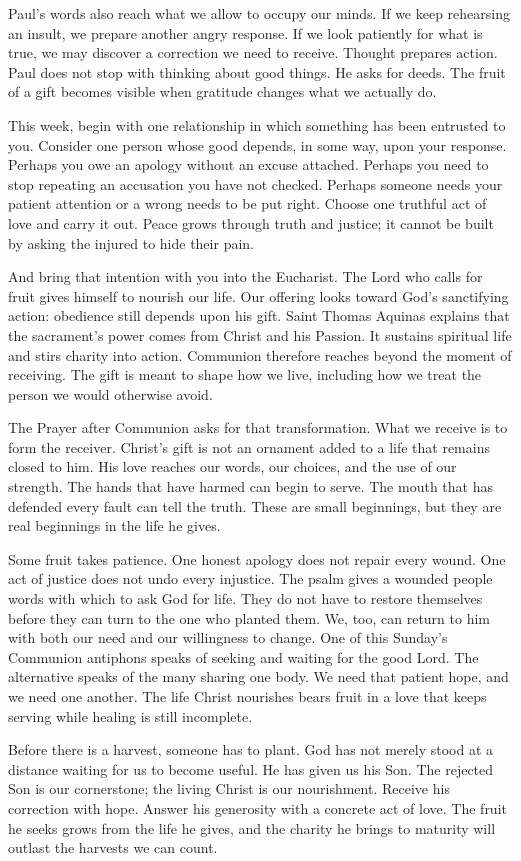 Paul's words also reach what we allow to occupy our minds. If we keep rehearsing an insult, we prepare another angry response. If we look patiently for what is true, we may discover a correction we need to receive. Thought prepares action. Paul does not stop with thinking about good things. He asks for deeds. The fruit of a gift becomes visible when gratitude changes what we actually do.

This week, begin with one relationship in which something has been entrusted to you. Consider one person whose good depends, in some way, upon your response. Perhaps you owe an apology without an excuse attached. Perhaps you need to stop repeating an accusation you have not checked. Perhaps someone needs your patient attention or a wrong needs to be put right. Choose one truthful act of love and carry it out. Peace grows through truth and justice; it cannot be built by asking the injured to hide their pain.

And bring that intention with you into the Eucharist. The Lord who calls for fruit gives himself to nourish our life. Our offering looks toward God's sanctifying action: obedience still depends upon his gift. Saint Thomas Aquinas explains that the sacrament's power comes from Christ and his Passion. It sustains spiritual life and stirs charity into action. Communion therefore reaches beyond the moment of receiving. The gift is meant to shape how we live, including how we treat the person we would otherwise avoid.

The Prayer after Communion asks for that transformation. What we receive is to form the receiver. Christ's gift is not an ornament added to a life that remains closed to him. His love reaches our words, our choices, and the use of our strength. The hands that have harmed can begin to serve. The mouth that has defended every fault can tell the truth. These are small beginnings, but they are real beginnings in the life he gives.

Some fruit takes patience. One honest apology does not repair every wound. One act of justice does not undo every injustice. The psalm gives a wounded people words with which to ask God for life. They do not have to restore themselves before they can turn to the one who planted them. We, too, can return to him with both our need and our willingness to change. One of this Sunday's Communion antiphons speaks of seeking and waiting for the good Lord. The alternative speaks of the many sharing one body. We need that patient hope, and we need one another. The life Christ nourishes bears fruit in a love that keeps serving while healing is still incomplete.

Before there is a harvest, someone has to plant. God has not merely stood at a distance waiting for us to become useful. He has given us his Son. The rejected Son is our cornerstone; the living Christ is our nourishment. Receive his correction with hope. Answer his generosity with a concrete act of love. The fruit he seeks grows from the life he gives, and the charity he brings to maturity will outlast the harvests we can count.
